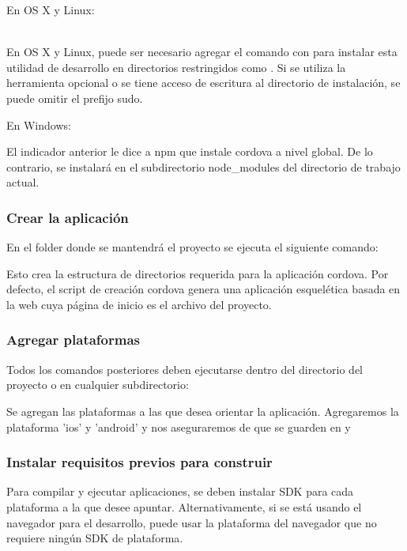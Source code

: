 En OS X y Linux:

\\

En OS X y Linux, puede ser necesario agregar el comando  con  para instalar esta utilidad de desarrollo en directorios restringidos como . Si se utiliza la herramienta opcional  o se tiene acceso de escritura al directorio de instalación, se puede omitir el prefijo sudo.


En Windows:

El indicador  anterior le dice a npm que instale cordova a nivel global. De lo contrario, se instalará en el subdirectorio node_modules del directorio de trabajo actual.

\subsubsection{Crear la aplicación}
En el folder donde se mantendrá el proyecto se ejecuta el siguiente comando:


Esto crea la estructura de directorios requerida para la aplicación cordova. Por defecto, el script de creación cordova genera una aplicación esquelética basada en la web cuya página de inicio es el archivo  del proyecto.

\subsubsection{Agregar plataformas}
Todos los comandos posteriores deben ejecutarse dentro del directorio del proyecto o en cualquier subdirectorio:


Se agregan las plataformas a las que desea orientar la aplicación. Agregaremos la plataforma 'ios' y 'android' y nos aseguraremos de que se guarden en  y 


\subsubsection{Instalar requisitos previos para construir}
Para compilar y ejecutar aplicaciones, se deben instalar SDK para cada plataforma a la que desee apuntar. Alternativamente, si se está usando el navegador para el desarrollo, puede usar la plataforma del navegador que no requiere ningún SDK de plataforma.

